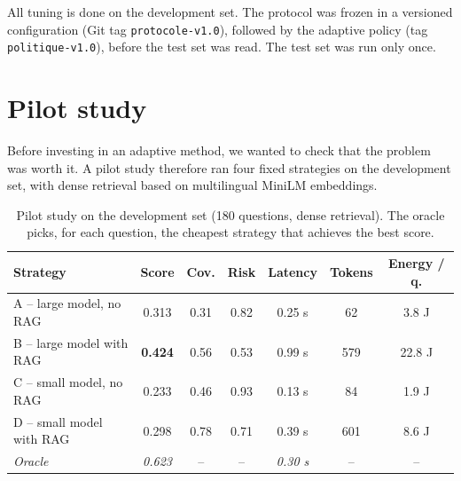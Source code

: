 \documentclass[11pt,a4paper]{article}
\begin{document}
\begin{center}
\end{center}

All tuning is done on the development set. The protocol was frozen in a versioned configuration (Git
tag \texttt{protocole-v1.0}), followed by the adaptive policy (tag \texttt{politique-v1.0}), before the
test set was read. The test set was run only once.

\section{Pilot study}\label{sec:pilote}

Before investing in an adaptive method, we wanted to check that the problem was worth it. A pilot study
therefore ran four fixed strategies on the development set, with dense retrieval based on multilingual
MiniLM embeddings.

\begin{table}[H]
\centering\small
\begin{tabular}{l c c c c c c}
\toprule
\textbf{Strategy} & \textbf{Score} & \textbf{Cov.} & \textbf{Risk} & \textbf{Latency} & \textbf{Tokens} & \textbf{Energy / q.} \\
\midrule
A -- large model, no RAG & 0.313 & 0.31 & 0.82 & 0.25 s & 62 & 3.8 J \\
B -- large model with RAG  & \textbf{0.424} & 0.56 & 0.53 & 0.99 s & 579 & 22.8 J \\
C -- small model, no RAG & 0.233 & 0.46 & 0.93 & 0.13 s & 84 & 1.9 J \\
D -- small model with RAG  & 0.298 & 0.78 & 0.71 & 0.39 s & 601 & 8.6 J \\
\midrule
\textit{Oracle} & \textit{0.623} & -- & -- & \textit{0.30 s} & -- & -- \\
\bottomrule
\end{tabular}
\caption{Pilot study on the development set (180 questions, dense retrieval). The oracle picks, for
each question, the cheapest strategy that achieves the best score.}
\label{tab:pilote}
\end{table}
\end{document}
